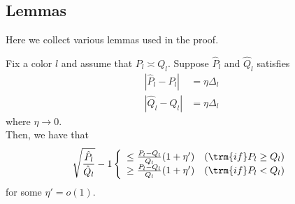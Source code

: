 \documentclass{article}
\begin{document}
\begin{comment}
Similarly, 
\begin{align*}
(K \log K)^2 \gamma \left(\frac{P_l \vee Q_l}{\Delta_l} \right)^2 &= 
   o \left( \frac{ (K \log K)^{r+2} (P_l \vee Q_l)^{r+2}}{ n^r \Delta_l^{2r + 2}} \right) \\
  &\rightarrow 0 \quad \trm{(under assumption~\ref{eqn:weak_rate_assumption2})}
\end{align*}

\end{proof}
\end{comment}


\subsection{Lemmas}

Here we collect various lemmas used in the proof.

\begin{lemma}
\label{lem:sqrt_ratio_pl_ql_minus_1}
Fix a color $l$ and assume that $P_l \asymp Q_l$. Suppose $\hat{P}_l$ and $\hat{Q}_l$ satisfies 
\begin{align*}
| \hat{P}_l - P_l | &= \eta \Delta_l  \\
| \hat{Q}_l - Q_l | &= \eta \Delta_l  
\end{align*}
where $\eta \rightarrow 0$. \\

Then, we have that 
\[
\sqrt{ \frac{\hat{P}_l }{\hat{Q}_l} } - 1 \left\{ \begin{array}{cc} 
                    \leq \frac{P_l - Q_l}{Q_l} (1 + \eta') & (\trm{if }  P_l \geq Q_l) \\
                    \geq \frac{P_l - Q_l}{Q_l} (1 + \eta') & (\trm{if } P_l < Q_l) 
           \end{array} \right.
\]
for some $\eta' = o(1)$. 
\end{lemma}
\end{document}

